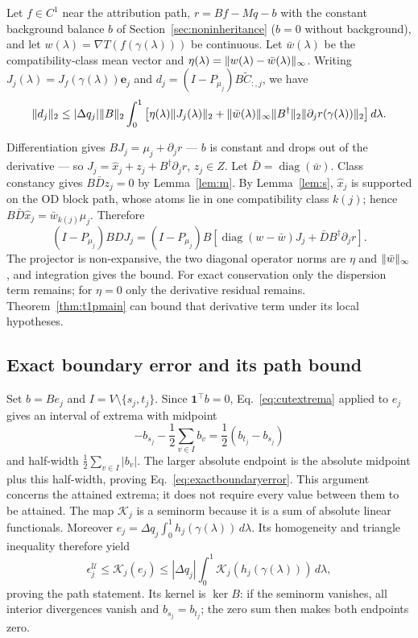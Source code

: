 \begin{proposition}\label{prop:combined}
Let $f\in C^1$ near the attribution path, $r=Bf-Mq-b$ with the constant
background balance $b$ of Section~\ref{sec:noninheritance} ($b=0$
without background), and let
$w(\lambda)=\nabla T(f(\gamma(\lambda)))$ be continuous.
Let $\bar w(\lambda)$ be the compatibility-class mean vector and
$\eta(\lambda)=\lVert w(\lambda)-\bar w(\lambda) \rVert_\infty$.
Writing $J_j(\lambda)=J_f(\gamma(\lambda))\mathbf e_j$ and
$d_j=(I-P_{\mu_j})B\widetilde C_{:,j}$, we have
\[
\lVert d_j \rVert_2\le |\Delta q_j|\lVert B \rVert_2\int_0^1\left[
\eta(\lambda)\lVert J_j(\lambda) \rVert_2+
\lVert \bar w(\lambda) \rVert_\infty\lVert B^\dagger \rVert_2
\lVert \partial_jr(\gamma(\lambda)) \rVert_2\right]d\lambda.
\]
\end{proposition}
\begin{pf}
Differentiation gives $BJ_j=\mu_j+\partial_jr$ --- $b$ is constant and
drops out of the derivative --- so
$J_j=\hat x_j+z_j+B^\dagger\partial_jr$, $z_j\in Z$.
Let $\bar D=\operatorname{diag}(\bar w)$. Class constancy gives
$B\bar Dz_j=0$ by Lemma~\ref{lem:m}. By Lemma~\ref{lem:s},
$\hat x_j$ is supported on the OD block path, whose atoms lie in one
compatibility class $k(j)$; hence
$B\bar D\hat x_j=\bar w_{k(j)}\mu_j$.
Therefore
\[
(I-P_{\mu_j})BDJ_j=(I-P_{\mu_j})B
\left[\operatorname{diag}(w-\bar w)J_j+
\bar DB^\dagger\partial_jr\right].
\]
The projector is non-expansive, the two diagonal operator norms are
$\eta$ and $\lVert \bar w \rVert_\infty$, and integration gives the bound.
For exact conservation only the dispersion term remains; for
$\eta=0$ only the derivative residual remains. Theorem~\ref{thm:t1pmain}
can bound that derivative term under its local hypotheses.
\end{pf}

\subsection{Exact boundary error and its path bound}\label{app:boundaryerror}
\begin{pf}
Set $b=Be_j$ and $I=V\setminus\{s_j,t_j\}$. Since $\mathbf1^\top b=0$,
Eq.~\eqref{eq:cutextrema} applied to $e_j$ gives an interval of extrema
with midpoint
\[
-b_{s_j}-\frac12\sum_{v\in I}b_v
=\frac12(b_{t_j}-b_{s_j})
\]
and half-width $\frac12\sum_{v\in I}|b_v|$. The larger absolute
endpoint is the absolute midpoint plus this half-width, proving
Eq.~\eqref{eq:exactboundaryerror}. This argument concerns the attained
extrema; it does not require every value between them to be attained.
The map $\mathcal K_j$ is a seminorm because it is a sum of absolute
linear functionals. Moreover
$e_j=\Delta q_j\int_0^1 h_j(\gamma(\lambda))\,d\lambda$.
Its homogeneity and triangle inequality therefore yield
\[
\epsilon_j^{\mathcal U}\le\mathcal K_j(e_j)
\le |\Delta q_j|\int_0^1\mathcal K_j(h_j(\gamma(\lambda)))\,d\lambda,
\]
proving the path statement. Its kernel is $\ker B$: if the seminorm
vanishes, all interior divergences vanish and $b_{s_j}=b_{t_j}$;
the zero sum then makes both endpoints zero.
\end{pf}

